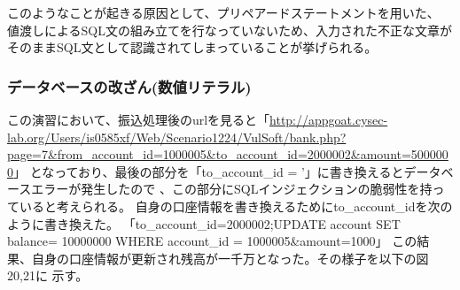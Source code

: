 \documentclass[dvipdfmx,autodetect-engine,titlepage]{jsarticle}
\begin{document}
\begin{figure}[h]
\begin{minipage}[b]{0.45\linewidth}
\begin{center}
    \end{center}
    \caption{}
  \end{minipage}
\end{figure}

このようなことが起きる原因として、プリペアードステートメントを用いた、
値渡しによるSQL文の組み立てを行なっていないため、入力された不正な文章が
そのままSQL文として認識されてしまっていることが挙げられる。

\subsubsection*{データベースの改ざん(数値リテラル)}
この演習において、振込処理後のurlを見ると「\url{http://appgoat.cysec-lab.org/Users/is0585xf/Web/Scenario1224/VulSoft/bank.php?page=7&from_account_id=1000005&to_account_id=2000002&amount=5000000}」
となっており、最後の部分を「to\_account\_id = '」に書き換えるとデータベースエラーが発生したので
、この部分にSQLインジェクションの脆弱性を持っていると考えられる。
自身の口座情報を書き換えるためにto\_account\_idを次のように書き換えた。
「to\_account\_id=2000002;UPDATE account SET balance= 10000000 WHERE account\_id = 1000005\&amount=1000」
この結果、自身の口座情報が更新され残高が一千万となった。その様子を以下の図20,21に
示す。
\end{document}
